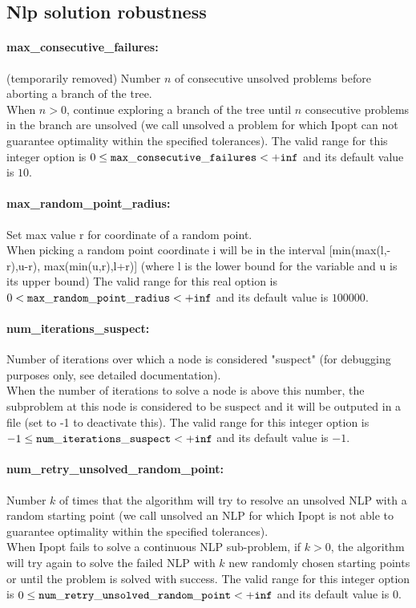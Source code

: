 \subsection{Nlp solution robustness}
\label{sec:Nlp_solution_robustness}
\paragraph{max\_consecutive\_failures:}\label{sec:max_consecutive_failures} (temporarily removed) Number $n$ of consecutive unsolved problems before aborting a branch of the tree. $\;$ \\
 When $n > 0$, continue exploring a branch of the
tree until $n$ consecutive problems in the branch
are unsolved (we call unsolved a problem for
which Ipopt can not guarantee optimality within
the specified tolerances). The valid range for this integer option is
$0 \le {\tt max\_consecutive\_failures } <  {\tt +inf}$
and its default value is $10$.


\paragraph{max\_random\_point\_radius:}\label{sec:max_random_point_radius} Set max value r for coordinate of a random point. $\;$ \\
 When picking a random point coordinate i will be
in the interval [min(max(l,-r),u-r),
max(min(u,r),l+r)] (where l is the lower bound
for the variable and u is its upper bound) The valid range for this real option is 
$0 <  {\tt max\_random\_point\_radius } <  {\tt +inf}$
and its default value is $100000$.


\paragraph{num\_iterations\_suspect:}\label{sec:num_iterations_suspect} Number of iterations over which a node is considered "suspect" (for debugging purposes only, see detailed documentation). $\;$ \\
 When the number of iterations to solve a node is
above this number, the subproblem at this node is
considered to be suspect and it will be outputed
in a file (set to -1 to deactivate this). The valid range for this integer option is
$-1 \le {\tt num\_iterations\_suspect } <  {\tt +inf}$
and its default value is $-1$.


\paragraph{num\_retry\_unsolved\_random\_point:}\label{sec:num_retry_unsolved_random_point} Number $k$ of times that the algorithm will try to resolve an unsolved NLP with a random starting point (we call unsolved an NLP for which Ipopt is not able to guarantee optimality within the specified tolerances). $\;$ \\
 When Ipopt fails to solve a continuous NLP
sub-problem, if $k > 0$, the algorithm will try
again to solve the failed NLP with $k$ new
randomly chosen starting points  or until the
problem is solved with success. The valid range for this integer option is
$0 \le {\tt num\_retry\_unsolved\_random\_point } <  {\tt +inf}$
and its default value is $0$.


